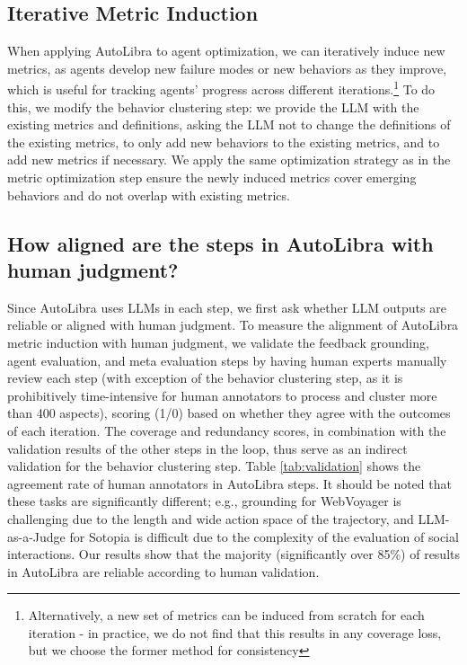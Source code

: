 \documentclass[../main.tex]{subfiles}
\begin{document}
\subsection{Iterative Metric Induction}
\label{sec:iterative-induction} When applying AutoLibra to agent optimization, we
can iteratively induce new metrics, as agents develop new failure modes or new
behaviors as they improve, which is useful for tracking agents' progress across
different iterations.\footnote{Alternatively, a new set of metrics can be induced
from scratch for each iteration - in practice, we do not find that this results
in any coverage loss, but we choose the former method for consistency} To do
this, we modify the behavior clustering step: we provide the LLM with the
existing metrics and definitions, asking the LLM not to change the definitions
of the existing metrics, to only add new behaviors to the existing metrics, and to add
new metrics if necessary. We apply the same optimization strategy as in the
metric optimization step ensure the newly induced metrics cover emerging
behaviors and do not overlap with existing metrics.
\smallskip



\subsection{How aligned are the steps in AutoLibra with human judgment?}
Since AutoLibra uses LLMs in each step, we first ask whether LLM outputs are
reliable or aligned with human judgment. To measure the alignment of AutoLibra metric
induction with human judgment, we validate the feedback grounding, agent evaluation,
and meta evaluation steps by having human experts manually review each step (with
exception of the behavior clustering step, as it is prohibitively time-intensive
for human annotators to process and cluster more than 400 aspects), scoring (1/0)
based on whether they agree with the outcomes of each iteration. The coverage and
redundancy scores, in combination with the validation results of the other steps
in the loop, thus serve as an indirect validation for the behavior clustering step.
Table \ref{tab:validation} shows the agreement rate of human annotators in
AutoLibra steps. It should be noted that these tasks are significantly different;
e.g., grounding for WebVoyager \citep{he2024webvoyager} is challenging due to the
length and wide action space of the trajectory, and LLM-as-a-Judge for Sotopia
\citep{zhousotopia} is difficult due to the complexity of the evaluation of social
interactions. Our results show that the majority (significantly over 85\%) of results
in AutoLibra are reliable according to human validation.
\end{document}
